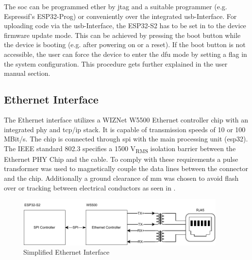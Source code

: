 The \acrshort{soc} can be programmed ether by \acrshort{jtag} and a suitable programmer (e.g. Espressif's ESP32-Prog) or conveniently over the integrated \acrshort{usb}-Interface.\newline
For uploading code via the \acrshort{usb}-Interface, the ESP32-S2 has to be set in to the device firmware update mode. This can be achieved by pressing the boot button while the device is booting (e.g. after powering on or a reset). If the boot button is not accessible, the user can force the device to enter the \acrshort{dfu} mode by setting a flag in the system configuration. This procedure gets further explained in the user manual section.\newline
\newpage

\subsection{Ethernet Interface}
The Ethernet interface utilizes a WIZNet W5500 Ethernet controller chip with an integrated \acrshort{phy} and \acrshort{tcp/ip} stack. It is capable of transmission speeds of 10 or 100 MBit/s. The chip is connected through \acrshort{spi} with the main processing unit (\gls{esp32}).
The IEEE standard 802.3 specifies a 1500 V\textsubscript{RMS} isolation barrier between the Ethernet PHY Chip and the cable. To comply with these requirements a pulse transformer was used to magnetically couple the data lines between the connector and the chip. Additionally a ground clearance of  mm was chosen to avoid flash over or tracking between electrical conductors as seen in . 

\begin{figure}[h!]
	\centering
	\includegraphics[height=2.5cm]{images/eth_interface}
	\caption{Simplified Ethernet Interface}
	\vspace{-1.4ex}
	\label{fig:eth-interface}
\end{figure}


